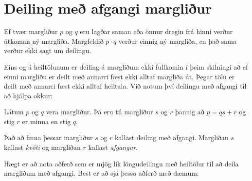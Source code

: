 \documentclass[a4paper,10pt,icelandic]{sphinxmanual}
\begin{document}
\section{Deiling með afgangi \sphinxhyphen{} margliður}
\label{\detokenize{Kafli06:deiling-me-afgangi-margliur}}
Ef tvær margliður \(p\) og \(q\) eru lagðar saman eða önnur dregin frá hinni verður útkoman ný margliða.
Margfeldið \(p \cdot q\) verður einnig ný margliða, en það sama verður ekki sagt um deilingu.

Eins og á heiltölunum er deiling á margliðum ekki fullkomin í þeim skilningi að ef einni margliðu er deilt með annarri fæst ekki alltaf margliða út. Þegar tölu er deilt með annarri fæst ekki alltaf heiltala.
Við notum því deilingu með afgangi til að hjálpa okkur:

Látum \(p\) og \(q\) vera margliður.
Þá eru til margliður \(s\) og \(r\) þannig að \(p=qs+r\) og stig \(r\) er minna en stig \(q\).

Það að finna þessar margliður \(s\) og \(r\) kallast deiling með afgangi. Margliðan \(s\) kallast \textit{kvóti} og margliðan \(r\) kallast \textit{afgangur}.

Hægt er að nota aðferð sem er mjög lík löngudeilingu með heiltölur til að deila margliðum með afgangi. Best er að sjá þessa aðferð með dæmum:
\end{document}
